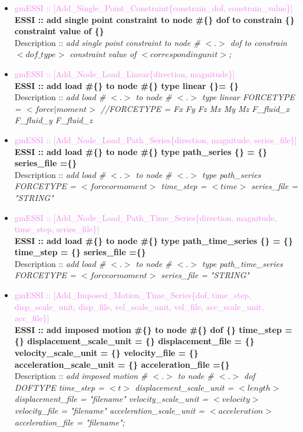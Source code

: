 \documentclass[11pt]{article}
\begin{document}
\begin{itemize}
  \item \textcolor{violet}{ gmESSI :: [Add\_Single\_Point\_Constraint\{constrain\_dof, constrain\_value\}]}\\
  \textbf{ ESSI :: add single point constraint to node \#\{\}  dof to constrain \{\} constraint value of \{\}}\\
  Description :: \textit{add single point constraint to node \# $<.>$ dof to constrain $<dof\_type>$ constraint value of $<corresponding unit>$;}

  \item \textcolor{violet}{ gmESSI :: [Add\_Node\_Load\_Linear\{direction, magnitude\}]}\\
  \textbf{ ESSI :: add load \#\{\} to node \#\{\} type linear \{\}= \{\} }\\
  Description :: \textit{add load \# $<.>$ to node \# $<.>$ type linear FORCETYPE = $<force|moment>$ //FORCETYPE = Fx Fy Fz Mx My Mz F\_fluid\_x F\_fluid\_y F\_fluid\_z}

  \item \textcolor{violet}{ gmESSI :: [Add\_Node\_Load\_Path\_Series\{direction, magnitude, series\_file\}]}\\
  \textbf{ ESSI :: add load \#\{\} to node \#\{\} type path\_series \{\} = \{\} series\_file =\{\}}\\
  Description :: \textit{add load \# $<.>$ to node \# $<.>$ type path\_series FORCETYPE = $<force or moment>$ time\_step = $<time>$ series\_file = "STRING"}

  \item \textcolor{violet}{ gmESSI :: [Add\_Node\_Load\_Path\_Time\_Series\{direction, magnitude, time\_step, series\_file\}]}\\
  \textbf{ ESSI :: add load \#\{\} to node \#\{\} type path\_time\_series \{\} = \{\} time\_step = \{\} series\_file =\{\}}\\
  Description :: \textit{add load \# $<.>$ to node \# $<.>$ type path\_time\_series FORCETYPE = $<force or moment>$ series\_file = "STRING"}

  \item \textcolor{violet}{ gmESSI :: [Add\_Imposed\_Motion\_Time\_Series\{dof, time\_step, disp\_scale\_unit, disp\_file, vel\_scale\_unit, vel\_file, acc\_scale\_unit, acc\_file\}]}\\
  \textbf{ ESSI :: add imposed motion \#\{\} to node \#\{\} dof \{\} time\_step = \{\} displacement\_scale\_unit = \{\} displacement\_file = \{\} velocity\_scale\_unit = \{\} velocity\_file = \{\} acceleration\_scale\_unit = \{\} acceleration\_file =\{\}}\\
  Description :: \textit{add imposed motion \# $<.>$ to node \# $<.>$ dof DOFTYPE time\_step = $<t>$ displacement\_scale\_unit = $<length>$ displacement\_file = "filename" velocity\_scale\_unit = $<velocity>$ velocity\_file = "filename" acceleration\_scale\_unit = $<acceleration>$ acceleration\_file = "filename";}


\end{itemize}
\end{document}
